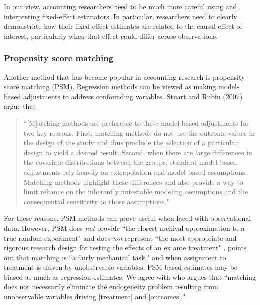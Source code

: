 \documentclass[12pt,reqno,titlepage]{amsart}
\theoremstyle{definition}
\begin{document}
\begin{doublespace}
In our view, accounting researchers need to be much more careful using and interpreting fixed-effect estimators. 
In particular, researchers need to clearly demonstrate how their fixed-effect estimates are related to the causal effect of interest, particularly when that effect could differ across observations.


\subsubsection{Propensity score matching}
Another method that has become popular in accounting research is propensity score matching (PSM).
Regression methods can be viewed as making model-based adjustments to address confounding variables.  
Stuart and Rubin (2007) argue that 

\begin{quote}\begin{singlespace} 
``[M]atching methods are preferable to these model-based adjustments for two key reasons. 
First, matching methods do not use the outcome values in the design of the study and thus preclude the selection of a particular design to yield a desired result.
Second, when there are large differences in the covariate distributions between the groups, standard model-based adjustments rely heavily on extrapolation and model-based assumptions.
Matching methods highlight these differences and also provide a way to limit reliance on the inherently untestable modeling assumptions and the consequential sensitivity to those assumptions."\end{singlespace} 
\end{quote}
For these reasons, PSM methods can prove useful when faced with observational data.
However, PSM does \emph{not} provide ``the closest archival approximation to a true random experiment" and does \emph{not} represent ``the most appropriate and rigorous research design for testing the effects of an ex ante treatment" \citep[p.\,1429]{Kirk:2014gx}.
\citet[pp.\,73-75]{Rosenbaum:2009ul} points out that matching is ``a fairly mechanical  task," and when assignment to treatment is driven by unobservable variables, PSM-based estimates may be biased as much as regression estimates.
We agree with \citet{MinuttiMeza:2014fn} who argues that ``matching does not necessarily eliminate the endogeneity problem resulting from unobservable variables driving [treatment] and [outcomes]."


\end{doublespace}
\end{document}
